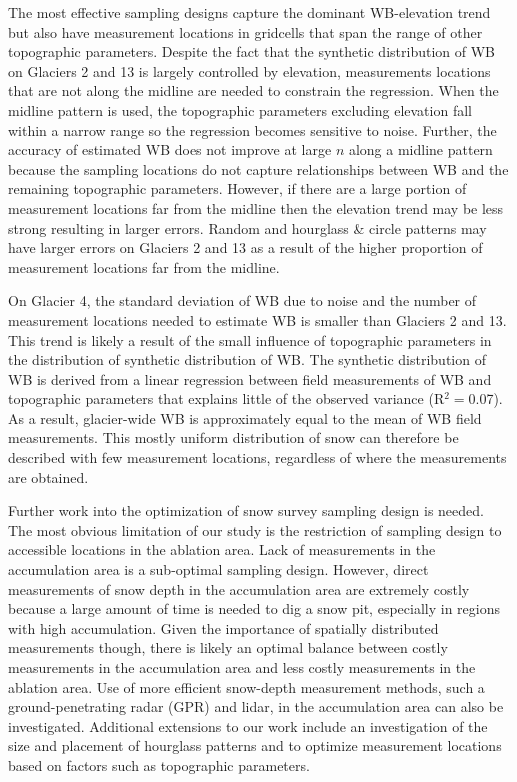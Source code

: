 \documentclass[twocolumn,letterpaper]{igs}
\begin{document}
The most effective sampling designs capture the dominant WB-elevation trend but also have measurement locations in gridcells that span the range of other topographic parameters. Despite the fact that the synthetic distribution of WB on Glaciers 2 and 13 is largely controlled by elevation, measurements locations that are not along the midline are needed to constrain the regression. When the midline pattern is used, the topographic parameters excluding elevation fall within a narrow range so the regression becomes sensitive to noise. Further, the accuracy of estimated WB does not improve at large $n$ along a midline pattern because the sampling locations do not capture relationships between WB and the remaining topographic parameters. However, if there are a large portion of measurement locations far from the midline then the elevation trend may be less strong resulting in larger errors. Random and hourglass \& circle patterns may have larger errors on Glaciers 2 and 13 as a result of the higher proportion of measurement locations far from the midline. 

On Glacier 4, the standard deviation of WB due to noise and the number of measurement locations needed to estimate WB is smaller than Glaciers 2 and 13. This trend is likely a result of the small influence of topographic parameters in the distribution of synthetic distribution of WB. The synthetic distribution of WB is derived from a linear regression between field measurements of WB and topographic parameters that explains little of the observed variance (R$^2=$0.07). As a result, glacier-wide WB is approximately equal to the mean of WB field measurements. This mostly uniform distribution of snow can therefore be described with few measurement locations, regardless of where the measurements are obtained. 

Further work into the optimization of snow survey sampling design is needed. The most obvious limitation of our study is the restriction of sampling design to accessible locations in the ablation area. Lack of measurements in the accumulation area is a sub-optimal sampling design. However, direct measurements of snow depth in the accumulation area are extremely costly because a large amount of time is needed to dig a snow pit, especially in regions with high accumulation. Given the importance of spatially distributed measurements though, there is likely an optimal balance between costly measurements in the accumulation area and less costly measurements in the ablation area. Use of more efficient snow-depth measurement methods, such a ground-penetrating radar (GPR) and lidar, in the accumulation area can also be investigated. Additional extensions to our work include an investigation of the size and placement of hourglass patterns and to optimize measurement locations based on factors such as topographic parameters. 
\end{document}
